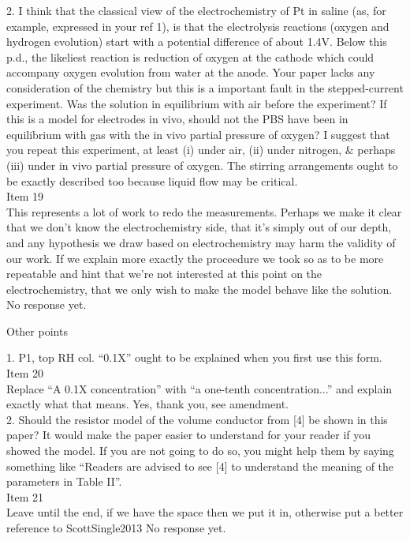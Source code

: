 \documentclass[journal, a4paper]{IEEEtran}
\begin{document}
{{2. I think that the classical view of the electrochemistry of Pt in saline (as, for example, expressed in your ref 1), is that the electrolysis reactions (oxygen and hydrogen evolution) start with a potential difference of about 1.4V. Below this p.d., the likeliest reaction is reduction of oxygen at the cathode which could accompany oxygen evolution from water at the anode. Your paper lacks any consideration of the chemistry but this is a important fault in the stepped-current experiment. Was the solution in equilibrium with air before the experiment? If this is a model for electrodes in vivo, should not the PBS have been in equilibrium with gas with the in vivo partial pressure of oxygen? I suggest that you repeat this experiment, at least (i) under air, (ii) under nitrogen, & perhaps (iii) under in vivo partial pressure of oxygen. The stirring arrangements ought to be exactly described too because liquid flow may be critical.\\
{\color{OliveGreen}
    Item 19\\
    {\color{Red} This represents a lot of work to redo the measurements. Perhaps we make it clear that we don't know the electrochemistry side, that it's simply out of our depth, and any hypothesis we draw based on electrochemistry may harm the validity of our work. If we explain more exactly the proceedure we took so as to be more repeatable and hint that we're not interested at this point on the electrochemistry, that we only wish to make the model behave like the solution.}
    No response yet.
}

Other points

1. P1, top RH col. ``0.1X'' ought to be explained when you first use this form.\\
{\color{OliveGreen}
    Item 20\\
    {\color{Red} Replace ``A 0.1X concentration'' with ``a one-tenth concentration...'' and explain exactly what that means.}
    Yes, thank you, see amendment.
}\\

2. Should the resistor model of the volume conductor from [4] be shown in this paper? It would make the paper easier to understand for your reader if you showed the model. If you are not going to do so, you might help them by saying something like ``Readers are advised to see [4] to understand the meaning of the parameters in Table II''.\\
{\color{OliveGreen}
    Item 21\\
    {\color{Red} Leave until the end, if we have the space then we put it in, otherwise put a better reference to ScottSingle2013}
    No response yet.
}\\

}}
\end{document}
